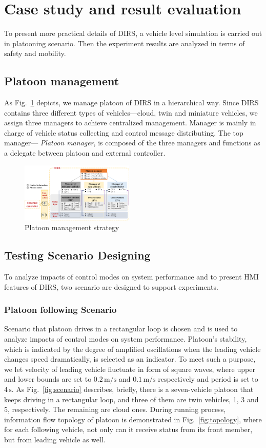 \documentclass[conference]{IEEEtran}
\begin{document}
\section{Case study and result evaluation}
\label{sec:simulation}
	To present more practical details of DIRS, a vehicle level simulation is carried out in platooning scenario. Then the experiment results are analyzed in terms of safety and mobility.

\subsection{Platoon management}\label{Scenario description}
	As Fig.~\ref{fig:platoonManager} depicts, we manage platoon of DIRS in a hierarchical way. Since DIRS contains three different types of vehicles---cloud, twin and miniature vehicles, we assign three managers to achieve centralized management. Manager is mainly in charge of vehicle status collecting and control message distributing. The top manager--- \textit{Platoon manager},  is composed of the three managers and functions as a delegate between platoon and external controller. 

\begin{figure}[htbp]
	\label{fig:platoonManager}
	\includegraphics[width=0.48\textwidth]{figure/platoonManagement.png}
	\caption{Platoon management strategy}
\end{figure}
\subsection{ Testing Scenario Designing}
	To analyze impacts of control modes on system performance and to present HMI features of DIRS, two scenario are designed to support experiments.
	\subsubsection{Platoon following Scenario}
	Scenario that platoon drives in a rectangular loop is chosen and is used to analyze impacts of control modes  on system performance. Platoon's stability, which is indicated by the degree of amplified oscillations when the leading vehicle changes speed dramatically, is selected as an indicator. To meet such a purpose, we let velocity of leading vehicle fluctuate in form of square waves, where upper and lower bounds are set to $0.2\,\mathrm{m/s}$ and $0.1\,\mathrm{m/s}$ respectively and period is set to 4$\,\mathrm{s}$. As Fig.~\ref{fig:scenario} describes, briefly, there is a seven-vehicle platoon that keeps driving in a rectangular loop, and three of them are twin vehicles, 1, 3 and 5, respectively. The remaining are cloud ones. During running process,  information flow topology of platoon is demonstrated in Fig.~\ref{fig:topology}, where for each following vehicle, not only can it receive status from its front member, but from leading vehicle as well.
	
\end{document}
